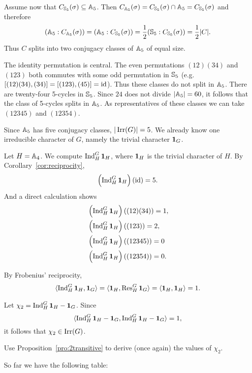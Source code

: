 Assume now that $C_{\mathbb{S}_5}(\sigma)\subseteq\mathbb{A}_5$. Then 
$C_{\mathbb{A}_5}(\sigma)=C_{\mathbb{S}_5}(\sigma)\cap\mathbb{A}_5=C_{\mathbb{S}_5}(\sigma)$
and therefore 
\[
(\mathbb{A}_5:C_{\mathbb{A}_5}(\sigma))=(\mathbb{A}_5:C_{\mathbb{S}_5}(\sigma))
=\frac12(\mathbb{S}_5:C_{\mathbb{S}_5}(\sigma))=\frac12|C|.
\]
Thus $C$ splits into two conjugacy classes of $\mathbb{A}_5$ of equal size. 

The identity permutation is central. The even permutations 
$(12)(34)$ and $(123)$ both commutes with some odd permutation in $\mathbb{S}_5$ (e.g. 
$[(12)(34),(34)]=[(123),(45)]=\operatorname{id}$). Thus these classes do not split
in $\mathbb{A}_5$. There are twenty-four 5-cycles in $\mathbb{S}_5$. Since $24$ does not
divide $|\mathbb{A}_5|=60$, it follows that the class of 5-cycles
splits in $\mathbb{A}_5$. As representatives of these classes
we can take $(12345)$ and $(12354)$. 

Since $\mathbb{A}_5$ has five conjugacy classes, $|\operatorname{Irr}(G)|=5$. We already know one irreducible character of $G$, namely the trivial character 
$\mathbf{1}_G$. 

Let $H=\mathbb{A}_4$. We compute $\operatorname{Ind}_H^G\mathbf{1}_H$, where $\mathbf{1}_H$ is the trivial character of $H$. 
By Corollary~\ref{cor:reciprocity}, 
\[
\left(\operatorname{Ind}_H^G\mathbf{1}_H\right)(\operatorname{id}) = 5.
\]
And a direct calculation shows
\begin{align*}
    &\left(\operatorname{Ind}_H^G\mathbf{1}_H\right)((12)(34)) = 1,\\
    &\left(\operatorname{Ind}_H^G\mathbf{1}_H\right)((123)) = 2,\\
    &\left(\operatorname{Ind}_H^G\mathbf{1}_H\right)((12345)) = 0\\ 
    &\left(\operatorname{Ind}_H^G\mathbf{1}_H\right)((12354)) = 0.
\end{align*}

By Frobenius' reciprocity,
\begin{align*}
    \langle\operatorname{Ind}_H^G\mathbf{1}_H,\mathbf{1}_G\rangle = \langle\mathbf{1}_H,\operatorname{Res}_H^G\mathbf{1}_G\rangle
    = \langle\mathbf{1}_H,\mathbf{1}_H\rangle=
    1.
\end{align*}

Let $\chi_2=\operatorname{Ind}_H^G\mathbf{1}_H-\mathbf{1}_G$. Since 
\[
\langle\operatorname{Ind}_H^G\mathbf{1}_H-\mathbf{1}_G,\operatorname{Ind}_H^G\mathbf{1}_H-\mathbf{1}_G\rangle=1, 
\]
it follows that $\chi_2\in\operatorname{Irr}(G)$. 

\begin{exercise}
\label{xca:A5_chi2}
    Use Proposition~\ref{pro:2transitive} to derive (once again) the values of $\chi_2$.
\end{exercise}

So far we have the 
following table: 

